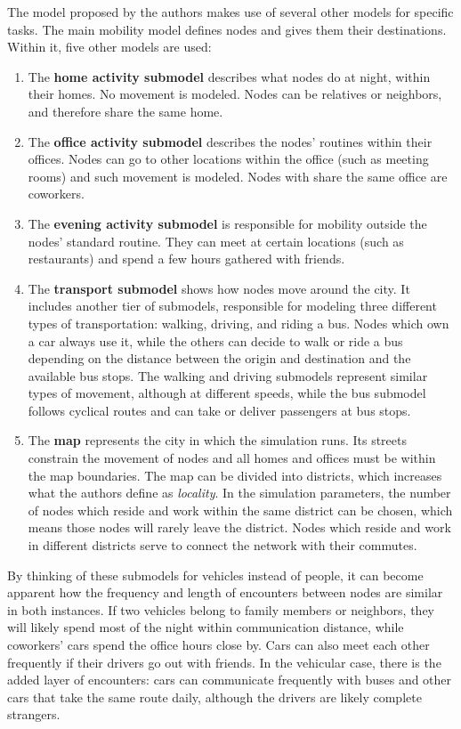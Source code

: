 \documentclass{article}
\begin{document}
The model proposed by the authors makes use of several other models for specific tasks.
The main mobility model defines nodes and gives them their destinations.
Within it, five other models are used:
\begin{enumerate}
\item 
The \textbf{home activity submodel} describes what nodes do at night, within their homes.
No movement is modeled.
Nodes can be relatives or neighbors, and therefore share the same home.
\item 
The \textbf{office activity submodel} describes the nodes' routines within their offices.
Nodes can go to other locations within the office (such as meeting rooms) and such movement is modeled.
Nodes with share the same office are coworkers.
\item 
The \textbf{evening activity submodel} is responsible for mobility outside the nodes' standard routine. 
They can meet at certain locations (such as restaurants) and spend a few hours gathered with friends.
\item
The \textbf{transport submodel} shows how nodes move around the city.
It includes another tier of submodels, responsible for modeling three different types of transportation: walking, driving, and riding a bus.
Nodes which own a car always use it, while the others can decide to walk or ride a bus depending on the distance between the origin and destination and the available bus stops.
The walking and driving submodels represent similar types of movement, although at different speeds, while the bus submodel follows cyclical routes and can take or deliver passengers at bus stops.
\item
The \textbf{map} represents the city in which the simulation runs.
Its streets constrain the movement of nodes and all homes and offices must be within the map boundaries.
The map can be divided into districts, which increases what the authors define as \textit{locality}.
In the simulation parameters, the number of nodes which reside and work within the same district can be chosen, which means those nodes will rarely leave the district.
Nodes which reside and work in different districts serve to connect the network with their commutes.
\end{enumerate}

By thinking of these submodels for vehicles instead of people, it can become apparent how the frequency and length of encounters between nodes are similar in both instances.
If two vehicles belong to family members or neighbors, they will likely spend most of the night within communication distance, while coworkers' cars spend the office hours close by.
Cars can also meet each other frequently if their drivers go out with friends.
In the vehicular case, there is the added layer of encounters: cars can communicate frequently with buses and other cars that take the same route daily, although the drivers are likely complete strangers.
\end{document}
